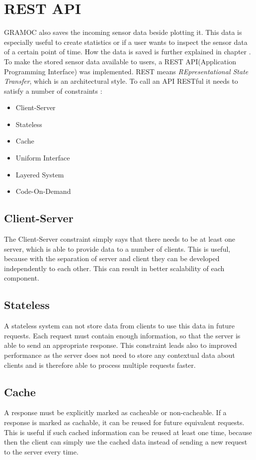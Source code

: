 \section{REST API}
GRAMOC also saves the incoming sensor data beside plotting it. This data is especially useful to create statistics or if a user wants to inspect the sensor data of a certain point of time. How the data is saved is further explained in chapter . To make the stored sensor data available to users, a REST API(Application Programming Interface) was implemented.
REST means \textit{REpresentational State Transfer}, which is an architectural style. To call an API RESTful it needs to satisfy a number of constraints \autocite{rest}:

\begin{itemize}
    \item Client-Server
    \item Stateless
    \item Cache
    \item Uniform Interface
    \item Layered System
    \item Code-On-Demand
\end{itemize}

\subsection{Client-Server}
The Client-Server constraint simply says that there needs to be at least one server, which is able to provide data to a number of clients. This is useful, because with the separation of server and client they can be developed independently to each other. This can result in better scalability of each component.

\subsection{Stateless}
A stateless system can not store data from clients to use this data in future requests. Each request must contain enough information, so that the server is able to send an appropriate response. This constraint leads also to improved performance as the server does not need to store any contextual data about clients and is therefore able to process multiple requests faster.

\subsection{Cache}
A response must be explicitly marked as cacheable or non-cacheable. If a response is marked as cachable, it can be reused for future equivalent requests. This is useful if such cached information can be reused at least one time, because then the client can simply use the cached data instead of sending a new request to the server every time.

